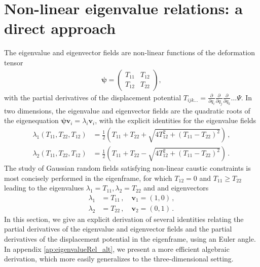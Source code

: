 \documentclass[a4paper, 11pt]{article}
\begin{document}
\section{Non-linear eigenvalue relations: a direct approach}\label{ap:eigenvalueRel}
The eigenvalue and eigenvector fields are non-linear functions of the deformation tensor
\begin{align}
\bm{\psi} = \begin{pmatrix} T_{11} & T_{12} \\ T_{12} & T_{22}\end{pmatrix},
\end{align}
with the partial derivatives of the displacement potential $T_{ijk\dots} = \frac{\partial}{\partial q_i}\frac{\partial}{\partial q_j}\frac{\partial}{\partial q_k}\dots \Psi$. In two dimensions, the eigenvalue and eigenvector fields are the quadratic roots of the eigenequation $\bm{\psi}\bm{v}_i=\lambda_i \bm{v}_i$, with the explicit identities for the eigenvalue fields
\begin{align}
\lambda_1(T_{11},T_{22},T_{12}) &= \frac{1}{2}\left(T_{11}+T_{22} + \sqrt{4 T_{12}^2 +(T_{11}-T_{22})^2}\right)\,,\label{eq:lambda_1}\\
\lambda_2(T_{11},T_{22},T_{12}) &= \frac{1}{2}\left(T_{11}+T_{22} - \sqrt{4 T_{12}^2 +(T_{11}-T_{22})^2}\right)\,.\label{eq:lambda_2}
\end{align}
The study of Gaussian random fields satisfying non-linear caustic constraints is most concisely performed in the eigenframe, for which $T_{12}=0$ and $T_{11} \geq T_{22}$ leading to the eigenvalues $\lambda_1=T_{11}, \lambda_2=T_{22}$ and and eigenvectors
\begin{align}
\lambda_{1} &= T_{11}\,,\quad \bm{v}_1=(1,0)\,,\\
\lambda_{2} &= T_{22}\,,\quad \bm{v}_2=(0,1)\,.
\end{align}
In this section, we give an explicit derivation of several identities relating the partial derivatives of the eigenvalue and eigenvector fields and the partial derivatives of the displacement potential in the eigenframe, using an Euler angle. In appendix \ref{ap:eigenvalueRel_alt}, we present a more efficient algebraic derivation, which more easily generalizes to the three-dimensional setting.
\end{document}
